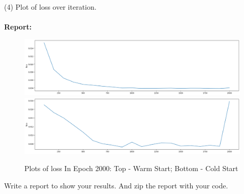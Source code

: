 \documentclass[11pt]{article}
\begin{document}
(4) Plot of loss over iteration.
\\~\\
\textbf{Report:}
\begin{figure}
    \centering
    \includegraphics[width=\linewidth]{images/warm_stat.png}
    \includegraphics[width=\linewidth]{images/cold_stat.png}
    \caption{Plots of loss In Epoch 2000: Top - Warm Start; Bottom - Cold Start}
\end{figure}

Write a report to show your results. And zip the report with your code.
\end{document}
